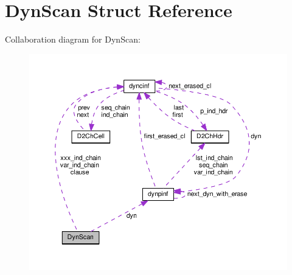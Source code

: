 \hypertarget{structDynScan}{}\section{Dyn\+Scan Struct Reference}
\label{structDynScan}


Collaboration diagram for Dyn\+Scan\+:\nopagebreak
\begin{figure}[H]
\begin{center}
\leavevmode
\includegraphics[width=350pt]{structDynScan__coll__graph}
\end{center}
\end{figure}
